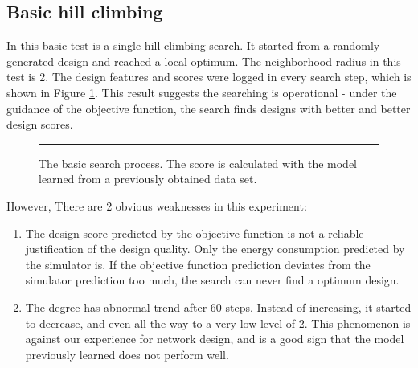 \documentclass[12pt]{article}
\theoremstyle{definition}
\begin{document}
\subsection{Basic hill climbing}
In this basic test is a single hill climbing search. It started from a randomly generated design and reached a local optimum. The neighborhood radius in this test is 2. The design features and scores were logged in every search step, which is shown in Figure \ref{fig:trace}. This result suggests the searching is operational - under the guidance of the objective function, the search finds designs with better and better design scores.
\begin{figure}[htb]
    \centering
    \begin{subfigure}
      {\texttt{[image: trace-2014-12-18-14-48-05.png]}}
    \end{subfigure}
    \rule{\linewidth}{1pt}
    \caption{The basic search process. The score is calculated with the model learned from a previously obtained data set.}
    \label{fig:trace}
\end{figure}
However, There are 2 obvious weaknesses in this experiment:
\begin{enumerate}
  \item The design score predicted by the objective function is not a reliable justification of the design quality. Only the energy consumption predicted by the simulator is. If the objective function prediction deviates from the simulator prediction too much, the search can never find a optimum design.
  \item The degree has abnormal trend after 60 steps. Instead of increasing, it started to decrease, and even all the way to a very low level of 2. This phenomenon is against our experience for network design, and is a good sign that the model previously learned does not perform well.
\end{enumerate}
\end{document}
